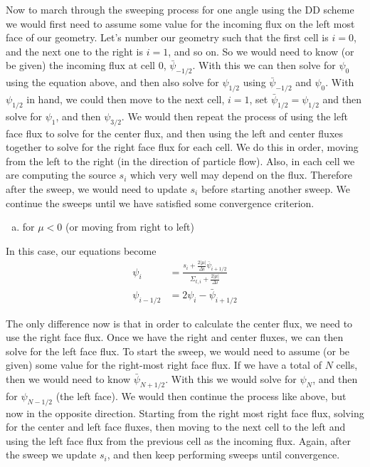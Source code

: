 \documentclass[10pt]{article}
\begin{document}
Now to march through the sweeping process for one angle using the DD scheme we would first need to assume some value for the incoming flux on the left most face of our geometry. Let's number our geometry such that the first cell is $i=0$, and the next one to the right is $i=1$, and so on. So we would need to know (or be given) the incoming flux at cell 0, $\bar{\psi}_{-1/2}$. With this we can then solve for $\psi_0$ using the equation above, and then also solve for $\psi_{1/2}$ using $\bar{\psi}_{-1/2}$ and $\psi_0$. With $\psi_{1/2}$ in hand, we could then move to the next cell, $i=1$, set $\bar{\psi}_{1/2} = \psi_{1/2}$ and then solve for $\psi_1$, and then $\psi_{3/2}$. We would then repeat the process of using the left face flux to solve for the center flux, and then using the left and center fluxes together to solve for the right face flux for each cell. We do this in order, moving from the left to the right (in the direction of particle flow). Also, in each cell we are computing the source $s_i$ which very well may depend on the flux. Therefore after the sweep, we would need to update $s_i$ before starting another sweep. We continue the sweeps until we have satisfied some convergence criterion.

%
%
%

\vspace{40pt}
\begin{enumerate}[(b)]
\item for $\mu < 0$ (or moving from right to left)
\end{enumerate}

In this case, our equations become
%
\begin{align*}
\psi_{i} &= \frac{s_{i} + \frac{2|\mu|}{\Delta i}\bar{\psi}_{i+1/2}}{\Sigma_{t,i} + \frac{2|\mu|}{\Delta i}} \\
\psi_{i - 1/2} &= 2\psi_{i} - \bar{\psi}_{i + 1/2}
\end{align*}

The only difference now is that in order to calculate the center flux, we need to use the right face flux. Once we have the right and center fluxes, we can then solve for the left face flux. To start the sweep, we would need to assume (or be given) some value for the right-most right face flux. If we have a total of $N$ cells, then we would need to know $\bar{\psi}_{N+1/2}$. With this we would solve for $\psi_N$, and then for $\psi_{N-1/2}$ (the left face). We would then continue the process like above, but now in the opposite direction. Starting from the right most right face flux, solving for the center and left face fluxes, then moving to the next cell to the left and using the left face flux from the previous cell as the incoming flux. Again, after the sweep we update $s_i$, and then keep performing sweeps until convergence.
\end{document}
